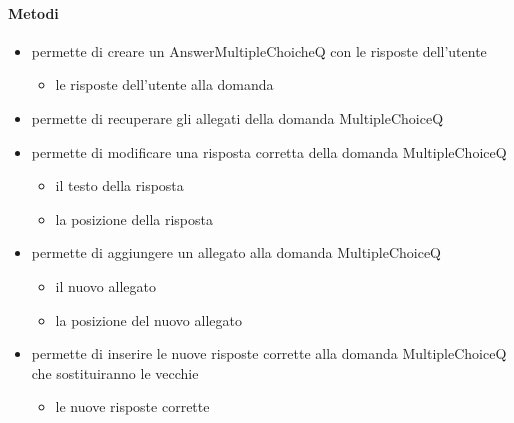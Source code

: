 \paragraph{Metodi}
\begin{itemize}
\item {}
\newline
permette di creare un AnswerMultipleChoicheQ con le risposte dell'utente
\newline
{}
\newline
\begin{itemize}
\item {}
\newline
le risposte dell'utente alla domanda
\end{itemize}
\item {}
\newline
permette di recuperare gli allegati della domanda MultipleChoiceQ
\newline
\item {}
\newline
permette di modificare una risposta corretta della domanda MultipleChoiceQ
\newline
{}
\newline
\begin{itemize}
\item {}
\newline
il testo della risposta
\item {}
\newline
la posizione della risposta
\end{itemize}
\item {}
\newline
permette di aggiungere un allegato alla domanda MultipleChoiceQ
\newline
{}
\newline
\begin{itemize}
\item {}
\newline
il nuovo allegato
\item {}
\newline
la posizione del nuovo allegato
\end{itemize}
\item {}
\newline
permette di inserire le nuove risposte corrette alla domanda MultipleChoiceQ che sostituiranno le vecchie
\newline
{}
\newline
\begin{itemize}
\item {}
\newline
le nuove risposte corrette
\end{itemize}
\end{itemize}
